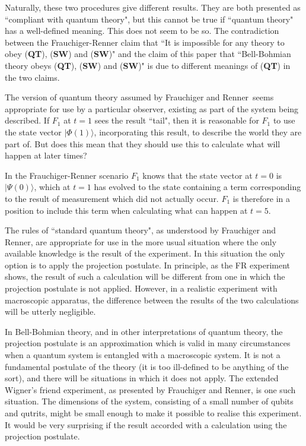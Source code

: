 \documentclass[12pt,reqno]{article}
\renewcommand{\(}{\left(}
\renewcommand{\)}{\right)}
\renewcommand{\.}{\centerdot}
\newcommand{\1}{\mathbf{1}}
\newcommand{\<}{\langle}
\renewcommand{\>}{\rangle}
\newcommand{\FR}{Frauchiger and Renner}
\theoremstyle{definition}
\theoremstyle{remark}
\numberwithin{equation}{section}
\begin{document}
Naturally, these two procedures give different results. They are both presented as ``compliant with quantum theory", but this cannot be true if ``quantum theory" has a well-defined meaning. This does not seem to be so. The contradiction between the Frauchiger-Renner claim that ``It is impossible for any theory to obey ({\bf QT}), ({\bf SW}) and ({\bf SW})" and the claim of this paper that ``Bell-Bohmian theory obeys ({\bf QT}), ({\bf SW}) and ({\bf SW})" is due to different meanings of ({\bf QT}) in the two claims.

The version of quantum theory assumed by \FR \ seems appropriate for use by a particular observer, existing as part of the system being described. If $F_1$ at $t = 1$ sees the result ``tail", then it is reasonable for $F_1$ to use the state vector $|\Phi(1)\>$, incorporating this result, to describe the world they are part of. But does this mean that they should use this to calculate what will happen at later times? 

In the Frauchiger-Renner scenario $F_1$ knows that the state vector at $t = 0$ is $|\Psi(0)\>$, which at $t = 1$ has evolved to the state containing a term corresponding to the result of measurement which did not actually occur. $F_1$ is therefore in a position to include this term when calculating what can happen at $t = 5$. 

The rules of ``standard quantum theory", as understood by \FR, are appropriate for use in the more usual situation where the only available knowledge is the result of the experiment. In this situation the only option is to apply the projection postulate. In principle, as the FR experiment shows, the result of such a calculation will be different from one in which the projection postulate is not applied. However, in a realistic experiment with macroscopic apparatus, the difference between the results of the two calculations will be utterly negligible. 

In Bell-Bohmian theory, and in other interpretations of quantum theory, the projection postulate is an approximation which is valid in many circumstances when a quantum system is entangled with a macroscopic system. It is not a fundamental postulate of the theory (it is too ill-defined to be anything of the sort), and there will be situations in which it does not apply. The extended Wigner's friend experiment, as presented by \FR, is one such situation. The dimensions of the system, consisting of a small number of qubits and qutrits, might be small enough to make it possible to realise this experiment. It would be very surprising if the result accorded with a calculation using the projection postulate. 
\end{document}
